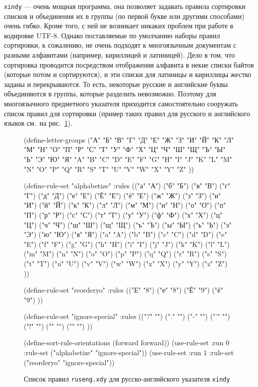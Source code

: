 \documentclass[a4paper,12pt,hyphens]{article}
\newcommand\exe[1]{\texttt{#1}}
\newcommand\file[1]{\texttt{#1}}
\begin{document}
\exe{xindy} --- очень мощная программа, она позволяет задавать правила
сортировки списков и объединения их в группы (по первой букве или другими
способами) очень гибко. Кроме того, с ней не возникает никаких проблем при работе
в кодировке UTF-8. Однако поставляемые по умолчанию наборы правил
сортировки, к сожалению, не очень подходят к многоязычным документам
с разными алфавитами (например, кириллицей и латиницей). Дело в том, что
сортировка проводится посредством отображения алфавита в некие списки
байтов (которые потом и сортируются), и эти списки для латиницы и кириллицы
жестко заданы и перекрываются. То есть, некоторые русские и английские буквы
объединяются в группы, которые разделить невозможно. Поэтому для многоязычного
предметного указателя приходится самостоятельно сооружать список правил для
сортировки (пример таких правил для русского и английского языков см.\ на
рис.~\ref{xindy1}).
\begin{figure}[tp]
\begin{xindycode}
(define-letter-groups ("А" "Б" "В" "Г" "Д" "Е" "Ж" "З" "И" "Й" "К"
    "Л" "М" "Н" "О" "П" "Р" "С" "Т" "У" "Ф" "Х" "Ц" "Ч" "Ш" "Щ" "Ъ"
    "Ы" "Ь" "Э" "Ю" "Я" "A" "B" "C" "D" "E" "F" "G" "H" "I" "J" "K"
    "L" "M" "N" "O" "P" "Q" "R" "S" "T" "U" "V" "W" "X" "Y" "Z"
    ))

(define-rule-set "alphabetize"
  :rules (("а" "А") ("б" "Б") ("в" "В") ("г" "Г") ("д" "Д") ("е" "Е")
          ("Ё" "Е") ("ё" "Е") ("ж" "Ж") ("з" "З") ("и" "И") ("й" "Й")
          ("к" "К") ("л" "Л") ("м" "М") ("н" "Н") ("о" "О") ("п" "П")
          ("р" "Р") ("с" "С") ("т" "Т") ("у" "У") ("ф" "Ф") ("х" "Х")
          ("ц" "Ц") ("ч" "Ч") ("ш" "Ш") ("щ" "Щ") ("ъ" "Ъ") ("ы" "Ы")
          ("ь" "Ь") ("э" "Э") ("ю" "Ю") ("я" "Я") ("a" "A") ("b" "B")
          ("c" "C") ("d" "D") ("e" "E") ("f" "F") ("g" "G") ("h" "H")
          ("i" "I") ("j" "J") ("k" "K") ("l" "L") ("m" "M") ("n" "N")
          ("o" "O") ("p" "P") ("q" "Q") ("r" "R") ("s" "S") ("t" "T")
          ("u" "U") ("v" "V") ("w" "W") ("x" "X") ("y" "Y") ("z" "Z")
          ))

(define-rule-set "reorderyo"
  :rules (("Е" "8") ("е" "8") ("Ё" "9") ("ё" "9")
	  ))

(define-rule-set "ignore-special"
  :rules (("?" "") ("." "") ("-" "") ("'" "") ("!" "") ("{" "") ("}" "")
          ))

(define-sort-rule-orientations (forward forward))
(use-rule-set :run 0
	      :rule-set ("alphabetize" "ignore-special"))
(use-rule-set :run 1
	      :rule-set ("reorderyo" "ignore-special"))
\end{xindycode}
\caption{Список правил \file{ruseng.xdy} для русско-английского указателя
\exe{xindy}}\label{xindy1}
\end{figure}
\end{document}

